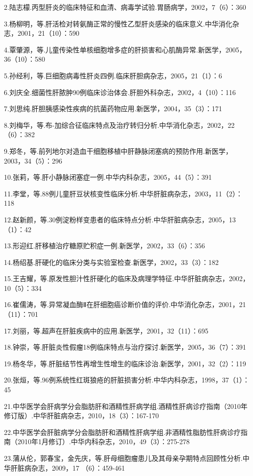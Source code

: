 2.陆志檬.丙型肝炎的临床特征和血清、病毒学试验.胃肠病学，2002，7（6）：360

3.杨柳明，等.肝活检对转氨酶正常的慢性乙型肝炎感染的临床意义.中华消化杂志，2001，21（10）：590

4.覃肇源，等.儿童传染性单核细胞增多症的肝损害和心肌酶异常.新医学，2005，36（10）：580

5.孙经利，等.巨细胞病毒性肝炎四例.临床肝胆病杂志，2005，21（1）：6

6.刘庆全.细菌性肝脓肿90例临床诊治体会.肝胆外科杂志，2002，4（10）：116

7.刘思纯.肝胆胰感染性疾病的抗菌药物应用.新医学，2004，35（3）：171

8.刘梅华，等.布-加综合征临床特点及治疗转归分析.中华消化杂志，2002，22（6）：382

9.郑冬，等.前列地尔对造血干细胞移植中肝静脉闭塞病的预防作用.新医学，2003，34（5）：296

10.张莉，等.肝小静脉闭塞症一例.中华内科杂志，2005，44（5）：391

11.李堂，等.88例儿童肝豆状核变性临床分析.中华肝脏病杂志，2003，11（2）：118

12.赵新颜，等.30例淀粉样变患者的临床特点分析.中华肝脏病杂志，2005，13（1）：42

13.形迎红.肝移植治疗糖原贮积症一例.新医学，2002，33（6）：356

14.杨绍基.肝硬化的临床分类与实验室检查.新医学，2002，33（3）：182

15.王吉耀，等.原发性胆汁性肝硬化的临床及病理学特征.中华肝脏病杂志，2002，10（5）：334

16.崔儒涛，等.异常凝血酶Ⅱ在肝细胞癌诊断价值的评价.中华消化杂志，2001，21（11）：701

17.刘丽，等.超声在肝脏疾病中的应用.新医学，2001，32（11）：695

18.钟崇，等.肝脏炎性假瘤18例临床特点与治疗探讨.新医学，2005，36（7）：391

19.杨冬华，等.肝脏结节性再增生性增生的临床诊治.新医学，2001，32（2）：119

20.张烜，等.96例系统性红斑狼疮的肝脏损害分析.中华内科杂志，1998，37（1）：45

21.中华医学会肝病学分会脂肪肝和酒精性肝病学组.酒精性肝病诊疗指南（2010年修订版）.中华肝脏病杂志，2010，18（3）：167-170

22.中华医学会肝脏病学分会脂肪肝和酒精性肝病学组.非酒精性脂肪性肝病诊疗指南（2010年1月修订）.中华内科杂志，2010，49（3）：275-278

23.蒲从伦，郭春宝，金先庆，等.肝母细胞瘤患儿及其母亲孕期特点回顾性分析.中华肝脏病杂志，2009，17
（6）：459-461

